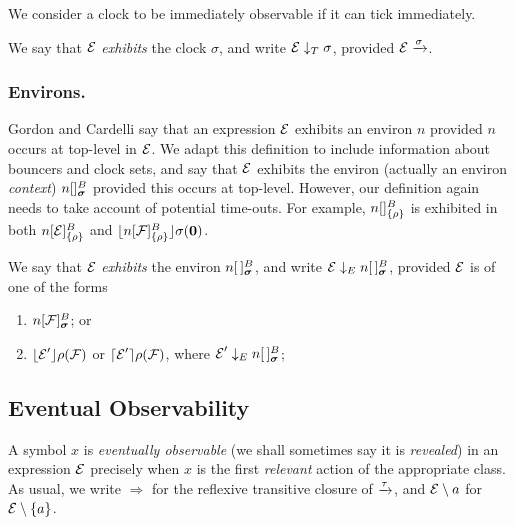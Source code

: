\documentclass[orivec,envcountsame]{llncs}
\newcommand{\Exhibits}[1]{\mathrel{\downarrow_{#1}}}
\newcommand{\ExhibitsC}{\Exhibits{T}}
\newcommand{\ExhibitsE}{\Exhibits{E}}
\newcommand{\Does}[1]{\xderives{#1}}
\newcommand{\DoesTaus}{\mathrel{\Rightarrow}}
\begin{document}
We consider a clock to be immediately observable if it can tick
immediately.

\begin{definition}
We say that $\text{$\mathcal{E}$}$ \emph{exhibits} the clock $\sigma$, and write $\expr
\ExhibitsC \sigma$, provided $\expr \Does{\sigma}$.
\end{definition}

\subsubsection{Environs.} 

Gordon and Cardelli \cite{GC99} say that an expression $\text{$\mathcal{E}$}$ exhibits an
environ $n$ provided $n$ occurs at top-level in $\text{$\mathcal{E}$}$. We adapt this
definition to include information about bouncers and clock sets, and say that
$\text{$\mathcal{E}$}$ exhibits the environ (actually an environ \emph{context}) $\locv{n}{}{B}{\vec{\sigma}}$
provided this occurs at top-level. However, our definition again needs to
take account of potential time-outs. For example, ${n}[  ]^{B}_{\{\rho\}}$ is
exhibited in both ${n}[ \text{$\mathcal{E}$} ]^{B}_{\{\rho\}}$ and
$\lfloor{{n}[ \text{$\mathcal{F}$}]^{B}_{\{\rho\}}}\rfloor {\sigma} ({\textbf{0}})$.

\begin{definition}
We say that $\text{$\mathcal{E}$}$ \emph{exhibits} the environ $\locv{n}{\,}{B}{\vec{\sigma}}$,
and write $\expr \ExhibitsE \locv{n}{\,}{B}{\vec{\sigma}}$, provided $\text{$\mathcal{E}$}$ is 
of one of the forms

\begin{enumerate}
\item
    $\locv{n}{\exprb}{B}{\vec{\sigma}}$; or
\item
    $\lfloor{\text{$\mathcal{E}$}' }\rfloor {\rho} ({\text{$\mathcal{F}$}})$ or $\lceil{\text{$\mathcal{E}$}' }\rceil {\rho} ({\text{$\mathcal{F}$}})$,
    where $\expr' \ExhibitsE \locv{n}{\,}{B}{\vec{\sigma}}$;
\end{enumerate}
\end{definition}


\subsection{Eventual Observability}
\label{sec:eventual-observability}

A symbol $x$ is \emph{eventually observable} (we shall sometimes say it
is \emph{revealed}) in an expression $\text{$\mathcal{E}$}$ precisely when $x$ is the
first \emph{relevant} action of the appropriate class. As usual, we
write $\DoesTaus$ for the reflexive transitive closure of $\Does{\tau}$, and
$\text{$\mathcal{E}$}\setminus {a}$ for $\text{$\mathcal{E}$}\setminus {\{a\}}$.
\end{document}
